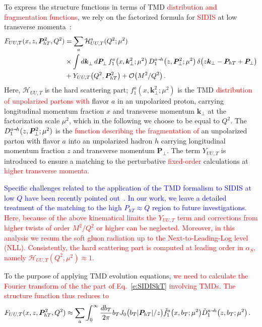 \documentclass[aps,preprintnumbers,showpacs,nofootinbib,superscriptaddress,floatfix]{revtex4}
\newcommand{\smarrow}{\mbox{\raisebox{-4.5pt}[0pt][0pt]{$\hspace{-1pt} 
		\vec{\phantom{v}}$}}}
\newcommand{\T}{\perp}
\newcommand{\Tperp}{T}
\begin{document}
To express the structure functions in terms of TMD \textcolor{red}{distribution and fragmentation functions}, 
we rely on the factorized formula 
for \textcolor{red}{SIDIS} at low transverse  
momenta~\cite{Collins:1981uk,Collins:1984kg,Ji:2002aa,Ji:2004wu,%
Collins:2011zzd,Aybat:2011zv,GarciaEchevarria:2011rb,Echevarria:2012pw,%
Collins:2012uy}:  
\begin{align}
\label{e:SIDISkT}
   F_{UU,T}(x,z, \bm{P}_{h \Tperp}^2, Q^2) &= \sum_a \mathcal{H}_{UU,T}^{a}(Q^2;\mu^2) \\ 
      &\times \int d\bm{k}_\T^{} \, d\bm{P}_\T^{} \,  f_1^a\big(x,\bm{k}_{\T}^2; \mu^2 \big) \, D_{1}^{a\smarrow h}\big(z,\bm{P}_{\T}^2; \mu^2 \big) \,
      \delta \big(z {\bm k}_{\T} - {\bm P}_{h \Tperp} + {\bm P}_{\T}\big)
\nonumber\\&
\nonumber + Y_{UU,T}\big(Q^2, \bm{P}_{h\Tperp}^2\big) + \mathcal{O}\big(M^2/Q^2\big) \, .
\end{align} 
Here, $\mathcal{H}_{UU,T}$ is the hard scattering part; $f_1^a(x,\bm{k}_{\T}^2;
\mu^2)$ is the TMD \textcolor{red}{distribution of unpolarized partons with} flavor $a$ in an unpolarized
proton, carrying longitudinal momentum fraction $x$ and transverse momentum
$\bm{k}_\T$ at the factorization scale $\mu^2$, which in the following we
choose to be equal to $Q^2$.  The $D_1^{a\smarrow h}(z, \bm{P}_{\T}^2;
\mu^2)$ is the \textcolor{red}{function describing the fragmentation of} an unpolarized parton with flavor $a$ into
an unpolarized hadron $h$ carrying longitudinal momentum fraction $z$ and
transverse momentum 
$\bm{P}_\T$. The term $Y_{UU,T}$ is introduced to ensure a matching
to the perturbative \textcolor{red}{fixed-order} calculations at \textcolor{red}{higher transverse momenta.} 

\textcolor{blue}{Specific challenges related to the application of the TMD formalism to SIDIS at low $Q$ have been recently pointed out~\cite{Collins:2016hqq}. In our work, we leave a detailed treatment of the matching to the high $P_{hT} \approx Q$ region to future investigations. }
\textcolor{red}{Here, because of the above kinematical limits the $Y_{UU,T}$ term and corrections from higher twists of order $M^2/Q^2$ or higher can be neglected. Moreover, in this analysis we resum the soft gluon radiation up to the Next-to-Leading-Log level (NLL). Consistently, the hard scattering part is computed at leading order in $\alpha_S$, namely $\mathcal{H}_{UU,T} (Q^2, \mu^2) \approx 1$. }

To the purpose of applying TMD evolution equations, 
\textcolor{red}{we need to calculate the Fourier transform of the the part of Eq.~\eqref{e:SIDISkT} involving TMDs. The structure function thus reduces to} 
\begin{align}
\label{e:SIDISkTFF}
   F_{UU,T}(x,z, \bm{P}_{h \Tperp}^2, Q^2) &\approx \sum_a  
      \int_0^{\infty} \frac{d b_T}{2 \pi} b_T J_0\big(b_T |\bm{P}_{hT}|/z\big)
      \tilde{f}_1^a\big(x, b_T;\mu^2\big) \tilde{D}_1^{a\smarrow h}\big(z, b_T; \mu^2 \big)
\nonumber \, .
\end{align} 
\end{document}
